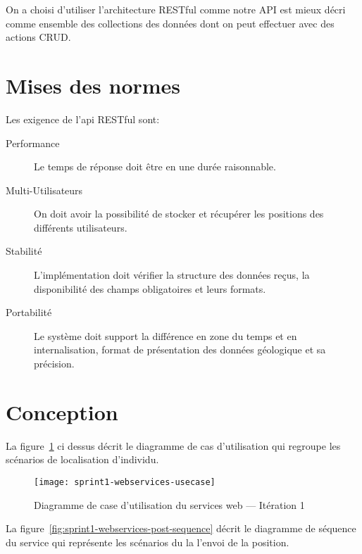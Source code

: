 On a choisi d'utiliser l'architecture RESTful comme notre API est mieux décri
comme ensemble des collections des données dont on peut effectuer avec des
actions CRUD\@.

\section{Mises des normes}

Les exigence de l'api RESTful sont:

\begin{description}
    \item [Performance] Le temps de réponse doit être en une durée raisonnable.
    \item [Multi-Utilisateurs] On doit avoir la possibilité de stocker et
        récupérer les positions des différents utilisateurs.
    \item [Stabilité] L'implémentation doit vérifier la structure des données
        reçus, la disponibilité des champs obligatoires et leurs formats.
    \item [Portabilité] Le système doit support la différence en zone du temps
        et en internalisation, format de présentation des données géologique et
        sa précision.
\end{description}


\section{Conception}

La figure~\ref{fig:sprint1-webservices-usecase} ci dessus décrit le diagramme
de cas d'utilisation qui regroupe les scénarios de localisation d'individu.

\begin{figure}[htbp]
    \centering
    \texttt{[image: sprint1-webservices-usecase]}
    \caption{Diagramme de case d'utilisation du services web --- Itération 1}
\label{fig:sprint1-webservices-usecase}
\end{figure}


La figure~\ref{fig:sprint1-webservices-post-sequence} décrit le diagramme de
séquence du service  qui représente les scénarios du la
l'envoi de la position.

